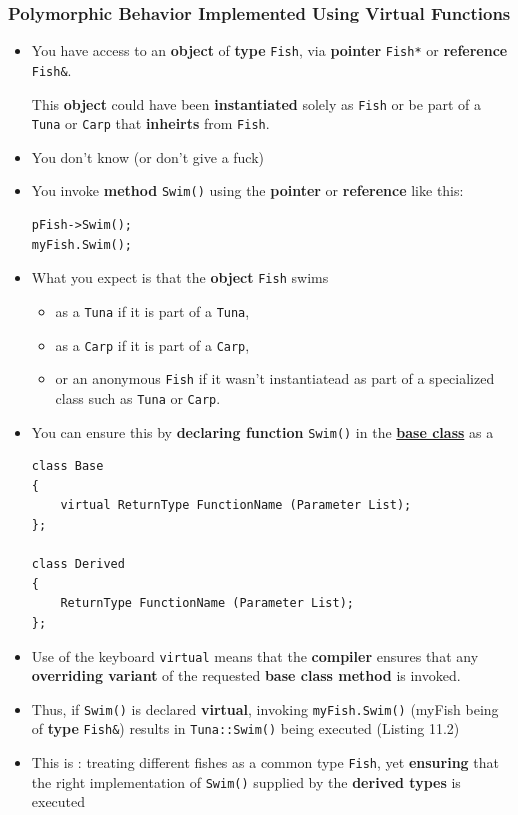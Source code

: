 \documentclass[10pt]{article}
\newcommand{\vocab}[1]{\fbox{\textbf{\textit{#1}}}}
\begin{document}
\subsubsection{Polymorphic Behavior Implemented Using Virtual Functions}
\begin{itemize}
	\item You have access to an \textbf{object} of \textbf{type} \verb|Fish|, via \textbf{pointer} \verb|Fish*| or \textbf{reference} \verb|Fish&|.

	This \textbf{object} could have been \textbf{instantiated} solely as \verb|Fish| or be part of a \verb|Tuna| or \verb|Carp| that \textbf{inheirts} from \verb|Fish|.

\item You don't know (or don't give a fuck)

\item You invoke \textbf{method} \verb|Swim()| using the \textbf{pointer} or \textbf{reference} like this:
	\begin{verbatim}
pFish->Swim();
myFish.Swim();
	\end{verbatim}

	\item What you expect is that the \textbf{object} \verb|Fish| swims
		\begin{itemize}
			\item as a \verb|Tuna| if it is part of a \verb|Tuna|, 
			\item as a \verb|Carp| if it is part of a \verb|Carp|, 
			\item or an anonymous \verb|Fish| if it wasn't instantiatead as part of a specialized class such as \verb|Tuna| or \verb|Carp|.
		\end{itemize}

	\item You can ensure this by \textbf{declaring function} \verb|Swim()| in the \underline{\textbf{base class}} as a \vocab{virtual function}

	\begin{verbatim}
class Base
{
	virtual ReturnType FunctionName (Parameter List);
};

class Derived
{
	ReturnType FunctionName (Parameter List);
};
	\end{verbatim}

\item Use of the keyboard \verb|virtual| means that the \textbf{compiler} ensures that any \textbf{overriding variant} of the requested \textbf{base class method} is invoked.

\item Thus, if \verb|Swim()| is declared \textbf{virtual}, invoking \verb|myFish.Swim()| (myFish being of \textbf{type} \verb|Fish&|) results in \verb|Tuna::Swim()| being executed (Listing 11.2)

\item This is \vocab{polymorphism}: treating different fishes as a common type \verb|Fish|, yet \textbf{ensuring} that the right implementation of \verb|Swim()| supplied by the \textbf{derived types} is executed
	\end{itemize}
\end{document}
